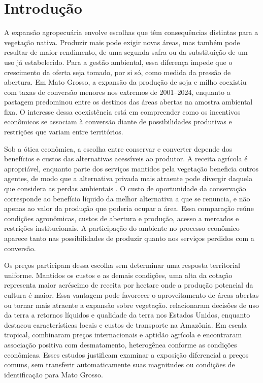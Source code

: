 \section{Introdução}
\label{sec:introducao}

A expansão agropecuária envolve escolhas que têm consequências distintas para a vegetação nativa. Produzir mais pode exigir novas áreas, mas também pode resultar de maior rendimento, de uma segunda safra ou da substituição de um uso já estabelecido. Para a gestão ambiental, essa diferença impede que o crescimento da oferta seja tomado, por si só, como medida da pressão de abertura. Em Mato Grosso, a expansão da produção de soja e milho coexistiu com taxas de conversão menores nos extremos de 2001--2024, enquanto a pastagem predominou entre os destinos das áreas abertas na amostra ambiental fixa. O interesse dessa coexistência está em compreender como os incentivos econômicos se associam à conversão diante de possibilidades produtivas e restrições que variam entre territórios.

Sob a ótica econômica, a escolha entre conservar e converter depende dos benefícios e custos das alternativas acessíveis ao produtor. A receita agrícola é apropriável, enquanto parte dos serviços mantidos pela vegetação beneficia outros agentes, de modo que a alternativa privada mais atraente pode divergir daquela que considera as perdas ambientais \cite{Angelsen2010}. O custo de oportunidade da conservação corresponde ao benefício líquido da melhor alternativa a que se renuncia, e não apenas ao valor da produção que poderia ocupar a área. Essa comparação reúne condições agronômicas, custos de abertura e produção, acesso a mercados e restrições institucionais. A participação do ambiente no processo econômico aparece tanto nas possibilidades de produzir quanto nos serviços perdidos com a conversão.

Os preços participam dessa escolha sem determinar uma resposta territorial uniforme. Mantidos os custos e as demais condições, uma alta da cotação representa maior acréscimo de receita por hectare onde a produção potencial da cultura é maior. Essa vantagem pode favorecer o aproveitamento de áreas abertas ou tornar mais atraente a expansão sobre vegetação.  relacionaram decisões de uso da terra a retornos líquidos e qualidade da terra nos Estados Unidos, enquanto  destacou características locais e custos de transporte na Amazônia. Em escala tropical,  combinaram preços internacionais e aptidão agrícola e encontraram associação positiva com desmatamento, heterogênea conforme as condições econômicas. Esses estudos justificam examinar a exposição diferencial a preços comuns, sem transferir automaticamente suas magnitudes ou condições de identificação para Mato Grosso.

